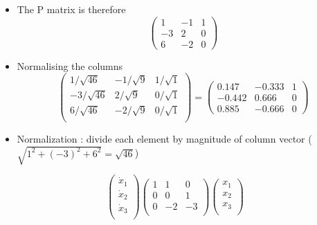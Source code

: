 \documentclass[12pt, a4paper]{report}
\begin{document}
{{\begin{itemize}
\item The P matrix is therefore
\[
\left(\begin{array}{ccc}
1 & -1 & 1 \\
-3 & 2 & 0 \\
6 & -2 & 0
\end{array} \right) \]
\end{itemize}
}




\newpage
{\Large
\begin{itemize}

\item Normalising the columns
\[
\left(\begin{array}{ccc}
1/ \sqrt{46} & -1/\sqrt{9} & 1/\sqrt{1} \\
-3/ \sqrt{46} & 2/\sqrt{9} & 0/\sqrt{1} \\
6/ \sqrt{46} & -2/\sqrt{9} & 0/\sqrt{1} \\
\end{array} \right)=
\left(\begin{array}{ccc}
0.147 & -0.333 & 1 \\
-0.442 & 0.666 & 0 \\
0.885 & -0.666 & 0
\end{array} \right) \]

\item Normalization : divide each element by magnitude of column vector ($ \sqrt{1^2 +(-3)^2 +6^2} =\sqrt{46}$)

\end{itemize}
}

\newpage
{\Large

\[ \left(
  \begin{array}{c}
    \dot{x}_1 \\
    \dot{x}_2 \\
    \dot{x}_3 \\
  \end{array}
\right)\left(
\begin{array}{ccc}
1 &1 &0\\
0 &0& 1\\
0 &-2& -3\\
 \end{array}
       \right)
        \left( \begin{array}{c}
    x_1 \\
    x_2 \\
    x_3 \\
  \end{array}
\right)\]

}}
\end{document}
